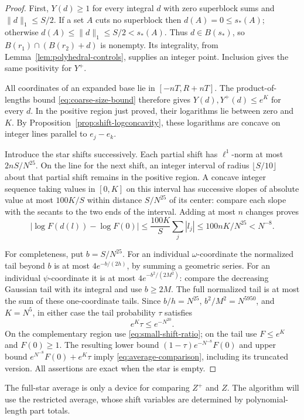 \begin{proof}
First, \(Y(d)\ge1\) for every integral \(d\) with zero superblock
sums and \(\|d\|_1\le S/2\).  If a set \(A\) cuts no
superblock then \(d(A)=0\le s_*(A)\); otherwise
\(d(A)\le\|d\|_1\le S/2<s_*(A)\).  Thus \(d\in B(s_*)\),
so \(B(r_1)\cap(B(r_2)+d)\) is nonempty.  Its integrality,
from Lemma~\ref{lem:polyhedral-controls}, supplies an integer
point.  Inclusion gives the same positivity for \(Y^+\).

All coordinates of an expanded base lie in
\([-nT,R+nT]\).  The product-of-lengths bound
\eqref{eq:coarse-size-bound} therefore gives
\(Y(d),Y^+(d)\le e^K\) for every \(d\).  In the positive region
just proved, their logarithms lie between zero and \(K\).
By Proposition~\ref{prop:shift-logconcavity}, these logarithms
are concave on integer lines parallel to \(e_j-e_k\).

Introduce the star shifts successively.  Each partial shift has
\(\ell^1\)-norm at most \(2nS/N^{25}\).  On the line for the
next shift, an integer interval of radius \(\lfloor S/10\rfloor\)
about that partial shift remains in the positive region.  A concave
integer sequence taking values in \([0,K]\) on this interval has
successive slopes of absolute value at most \(100K/S\) within
distance \(S/N^{25}\) of its center: compare each slope with the
secants to the two ends of the interval.  Adding at most \(n\)
changes proves
\[
 |\log F(d(l))-\log F(0)|
 \le \frac{100K}{S}\sum_j|l_j|
 \le 100nK/N^{25}<N^{-8}.
\]

For completeness, put \(b=S/N^{25}\).  For an individual
\(\omega\)-coordinate the normalized tail beyond \(b\) is at
most \(4e^{-b/(2h)}\), by summing a geometric series.  For an
individual \(\psi\)-coordinate it is at most
\(4e^{-b^2/(2M^2)}\): compare the decreasing Gaussian tail with
its integral and use \(b\ge2M\).  The full normalized tail is
at most the sum of these one-coordinate tails.  Since
\(b/h=N^{25}\), \(b^2/M^2=N^{5950}\), and \(K=N^5\),
in either case the tail probability \(\tau\) satisfies
\[
 e^K\tau\le e^{-N^{20}}.
\]
On the complementary region use \eqref{eq:small-shift-ratio};
on the tail use \(F\le e^K\) and \(F(0)\ge1\).  The resulting
lower bound \((1-\tau)e^{-N^{-8}}F(0)\) and upper bound
\(e^{N^{-8}}F(0)+e^K\tau\) imply
\eqref{eq:average-comparison}, including its truncated version.
All assertions are exact when the star is empty.
\end{proof}

The full-star average is only a device for comparing \(Z^+\) and
\(Z\).  The algorithm will use the restricted average, whose shift
variables are determined by polynomial-length part totals.

